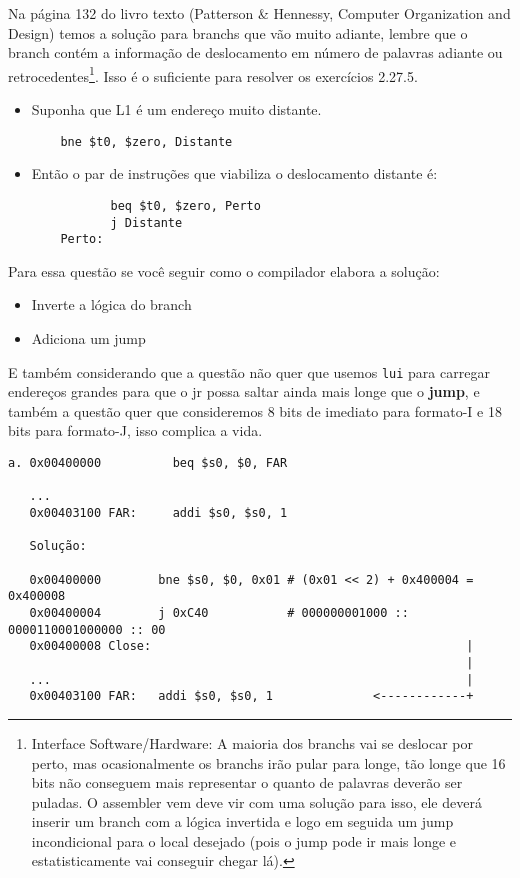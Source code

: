 \documentclass{article}
\begin{document}
Na página 132 do livro texto (Patterson \& Hennessy, Computer Organization and
Design) temos a solução para branchs que vão muito adiante, lembre que o branch
contém a informação de deslocamento em número de palavras adiante ou
retrocedentes\footnote{Interface Software/Hardware: A maioria dos branchs vai se
deslocar por perto, mas ocasionalmente os branchs irão pular para longe, tão
longe que 16 bits não conseguem mais representar o quanto de palavras deverão
ser puladas. O assembler vem deve vir com uma solução para isso, ele deverá
inserir um branch com a lógica invertida e logo em seguida um jump incondicional
para o local desejado (pois o jump pode ir mais longe e estatisticamente vai
conseguir chegar lá).}. Isso é o suficiente para resolver os exercícios 2.27.5.

\begin{itemize}
\item Suponha que L1 é um endereço muito distante.
  \begin{verbatim}
    bne $t0, $zero, Distante
  \end{verbatim}
\item Então o par de instruções que viabiliza o deslocamento distante é:
  \begin{verbatim}
           beq $t0, $zero, Perto
           j Distante
    Perto:
  \end{verbatim}
\end{itemize}

Para essa questão se você seguir como o compilador elabora a solução:
\begin{itemize}
\item Inverte a lógica do branch
\item Adiciona um jump
\end{itemize}

E também considerando que a questão não quer que usemos \verb|lui| para carregar
endereços grandes para que o jr possa saltar ainda mais longe que o
\textbf{jump}, e também a questão quer que consideremos 8 bits de imediato para
formato-I e 18 bits para formato-J, isso complica a vida.

\begin{verbatim}
a. 0x00400000          beq $s0, $0, FAR

   ...
   0x00403100 FAR:     addi $s0, $s0, 1

   Solução:

   0x00400000        bne $s0, $0, 0x01 # (0x01 << 2) + 0x400004 = 0x400008
   0x00400004        j 0xC40           # 000000001000 :: 0000110001000000 :: 00
   0x00400008 Close:                                            |
                                                                |
   ...                                                          |
   0x00403100 FAR:   addi $s0, $s0, 1              <------------+
\end{verbatim}
\end{document}
